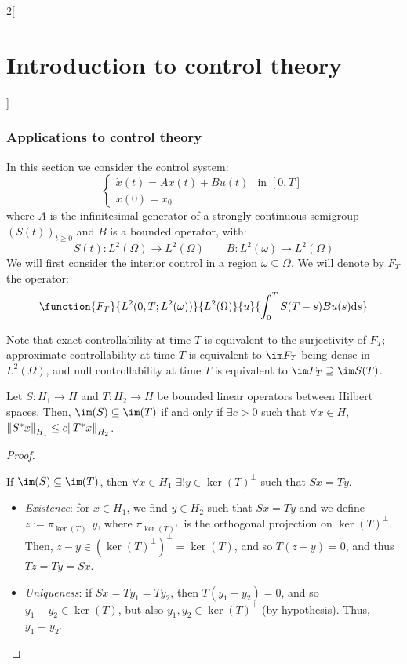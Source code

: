 \documentclass[../../../main_math.tex]{subfiles}
\begin{document}
\begin{multicols}{2}[\section{Introduction to control theory}]
  \subsubsection{Applications to control theory}
  In this section we consider the control system:
  \begin{equation}\label{ICT:control_system}
    \begin{cases}
      \dot{x}(t)=Ax(t)+Bu(t) & \text{in } [0,T] \\
      x(0)=x_0
    \end{cases}
  \end{equation}
  where $A$ is the infinitesimal generator of a strongly continuous semigroup $(S(t))_{t\geq 0}$ and $B$ is a bounded operator, with:
  $$
    S(t):L^2(\Omega)\to L^2(\Omega)\qquad B:L^2(\omega)\to L^2(\Omega)
  $$
  We will first consider the interior control in a region $\omega\subseteq \Omega$. We will denote by $F_T$ the operator:
  $$
    \function{F_T}{L^2(0,T;L^2(\omega))}{L^2(\Omega)}{u}{\int_0^T S(T-s)Bu(s)\dd s}
  $$
  \begin{remark}
    Note that exact controllability at time $T$ is equivalent to the surjectivity of $F_T$; approximate controllability at time $T$ is equivalent to $\im F_T$ being dense in $L^2(\Omega)$, and null controllability at time $T$ is equivalent to $\im F_T\supseteq \im S(T)$.
  \end{remark}
  \begin{theorem}\label{ICT:controltheorem}
    Let $S:H_1\to H$ and $T:H_2\to H$ be bounded linear operators between Hilbert spaces. Then, $\im(S)\subseteq \im(T)$ if and only if $\exists c>0$ such that $\forall x\in H$, $\norm{S^*x}_{H_1}\leq c\norm{T^*x}_{H_2}$.
  \end{theorem}
  \begin{proof}
    \begin{itemizeiff}
      If $\im(S)\subseteq \im(T)$, then $\forall x\in H_1$ $\exists! y\in \ker(T)^\perp$ such that $Sx=Ty$.
      \begin{itemize}
        \item \textit{Existence}: for $x\in H_1$, we find $y\in H_2$ such that $Sx=Ty$ and we define $z:=\pi_{\ker(T)^\perp}y$, where $\pi_{\ker(T)^\perp}$ is the orthogonal projection on $\ker(T)^\perp$. Then, $z-y\in (\ker(T)^\perp)^\perp=\ker(T)$, and so $T(z-y)=0$, and thus $Tz=Ty=Sx$.
        \item \textit{Uniqueness}: if $Sx=Ty_1=Ty_2$, then $T(y_1-y_2)=0$, and so $y_1-y_2\in \ker(T)$, but also $y_1,y_2\in \ker(T)^\perp$ (by hypothesis). Thus, $y_1=y_2$.

\end{itemize}
\end{itemizeiff}
\end{proof}
\end{multicols}
\end{document}
